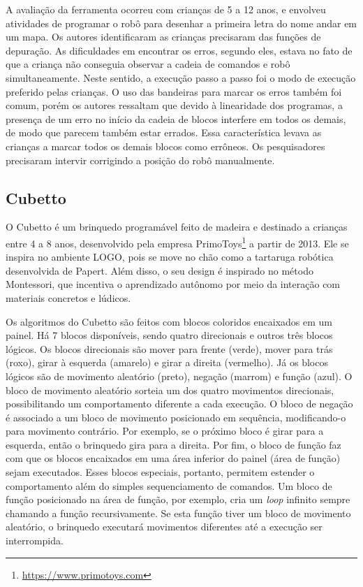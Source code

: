 A avaliação da ferramenta ocorreu com crianças de 5 a 12 anos, e envolveu atividades de programar o robô para desenhar a primeira letra do nome andar em um mapa. Os autores identificaram as crianças precisaram das funções de depuração. As dificuldades em encontrar os erros, segundo eles, estava no fato de que a criança não conseguia observar a cadeia de comandos e robô simultaneamente. Neste sentido, a execução passo a passo foi o modo de execução preferido pelas crianças. O uso das bandeiras para marcar os erros também foi comum, porém os autores ressaltam que devido à linearidade dos programas, a presença de um erro no início da cadeia de blocos interfere em todos os demais, de modo que parecem também estar errados. Essa característica levava as crianças a marcar todos os demais blocos como errôneos. Os pesquisadores precisaram intervir corrigindo a posição do robô manualmente.

\subsection{Cubetto}
\label{sub_sec:cubetto}
O Cubetto é um brinquedo programável feito de madeira e destinado a crianças entre 4 a 8 anos, desenvolvido pela empresa PrimoToys\footnote{\url{https://www.primotoys.com}} a partir de 2013. Ele se inspira no ambiente LOGO, pois se move no chão como a tartaruga robótica desenvolvida de Papert. Além disso, o seu design é inspirado no método Montessori, que incentiva o aprendizado autônomo por meio da interação com materiais concretos e lúdicos.

Os algoritmos do Cubetto são feitos com blocos coloridos encaixados em um painel. Há 7 blocos disponíveis, sendo quatro direcionais e outros três blocos lógicos. Os blocos direcionais são mover para frente (verde), mover para trás (roxo), girar à esquerda (amarelo) e girar a direita (vermelho). Já os blocos lógicos são de movimento aleatório (preto), negação (marrom) e função (azul). O bloco de movimento aleatório sorteia um dos quatro movimentos direcionais, possibilitando um comportamento diferente a cada execução. O bloco de negação é associado a um bloco de movimento posicionado em sequência,  modificando-o para movimento contrário. Por exemplo, se o próximo bloco é girar para a esquerda, então o brinquedo gira para a direita. Por fim, o bloco de função faz com que os blocos encaixados em uma área inferior do painel (área de função) sejam executados. Esses blocos especiais, portanto, permitem estender o comportamento além do simples sequenciamento de comandos. Um bloco de função posicionado na área de função, por exemplo, cria um \textit{loop} infinito sempre chamando a função recursivamente. Se esta função tiver um bloco de movimento aleatório, o brinquedo executará movimentos diferentes até a execução ser interrompida.

